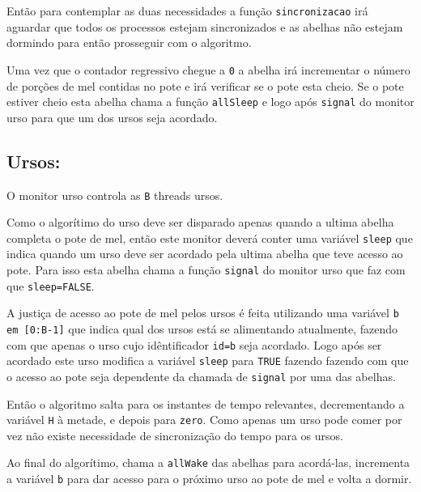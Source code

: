 \documentclass[12pt,a4paper]{article}
\begin{document}
Então para contemplar as duas necessidades a função \verb+sincronizacao+ irá aguardar que todos os processos estejam sincronizados e as abelhas não estejam dormindo para então prosseguir com o algoritmo.

Uma vez que o contador regressivo chegue a \verb+0+ a abelha irá incrementar o número de porções de mel contidas no pote e irá verificar se o pote esta cheio. Se o pote estiver cheio esta abelha chama a função \verb+allSleep+ e logo após \verb+signal+ do monitor urso para que um dos ursos seja acordado.

\subsection{Ursos:}

O monitor urso controla as \verb+B+ threads ursos.

Como o algorítimo do urso deve ser disparado apenas quando a ultima abelha completa o pote de mel, então este monitor deverá conter uma variável \verb+sleep+ que indica quando um urso deve ser acordado pela ultima abelha que teve acesso ao pote. Para isso esta abelha chama a função \verb+signal+ do monitor urso que faz com que \verb+sleep=FALSE+.

A justiça de acesso ao pote de mel pelos ursos é feita utilizando uma variável \verb+b em [0:B-1]+  que indica qual dos ursos está se alimentando atualmente, fazendo com que apenas o urso cujo idêntificador \verb+id=b+ seja acordado. Logo após ser acordado este urso modifica a variável \verb+sleep+ para \verb+TRUE+ fazendo fazendo com que o acesso ao pote seja dependente da chamada de \verb+signal+ por uma das abelhas.

Então o algoritmo salta para os instantes de tempo relevantes, decrementando a variável \verb+H+ à metade, e depois para \verb+zero+. Como apenas um urso pode comer por vez não existe necessidade de sincronização do tempo para os ursos.

Ao final do algorítimo, chama a \verb+allWake+ das abelhas para acordá-las, incrementa a variável \verb+b+ para dar acesso para o próximo urso ao pote de mel e volta a dormir.
\end{document}
